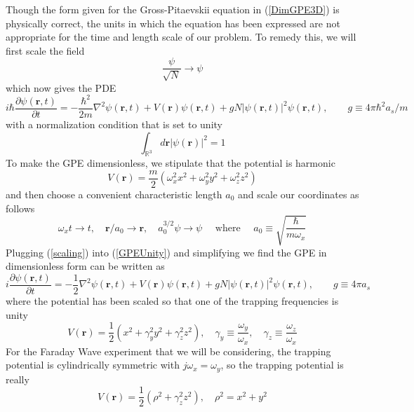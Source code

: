 \documentclass[12]{article}
\begin{document}
Though the form given for the Gross-Pitaevskii equation in (\ref{DimGPE3D}) is physically correct, the units in which the equation has been expressed are not appropriate for the time and length scale of our problem. To remedy this, we will first scale the field
\begin{equation}
\frac{\psi}{\sqrt{N}} \rightarrow \psi
\end{equation}
which now gives the PDE
\begin{equation}
i \hbar \frac{\partial \psi(\mathbf{r}, t)}{\partial t}=-\frac{\hbar^{2}}{2 m} \nabla^{2} \psi(\mathbf{r}, t)+V(\mathbf{r}) \psi(\mathbf{r}, t)+ gN|\psi(\mathbf{r}, t)|^{2} \psi(\mathbf{r}, t), \quad \quad g \equiv 4 \pi \hbar^{2} a_{s} / m
\label{GPEUnity}
\end{equation}
with a normalization condition that is set to unity
\begin{equation}
\int_{\mathbb{R}^{3}} d \mathbf{r}|\psi(\mathbf{r})|^{2} = 1
\end{equation}
To make the GPE dimensionless, we stipulate that the potential is harmonic
\begin{equation}
V(\textbf{r}) = \frac{m}{2}\left(\omega_{x}^{2} x^{2}+\omega_{y}^{2} y^{2}+\omega_{z}^{2} z^{2}\right)
\end{equation}
and then choose a convenient characteristic length $a_0$ and scale our coordinates as follows
\begin{equation}
\omega_{x} t \rightarrow t, \quad \mathbf{r} / a_{0} \rightarrow \mathbf{r}, \quad a_{0}^{3 / 2} \psi \rightarrow \psi \quad \text { where } \quad a_{0} \equiv \sqrt{\frac{\hbar }{ m \omega_{x}}}
\label{scaling}
\end{equation}
Plugging (\ref{scaling}) into (\ref{GPEUnity}) and simplifying we find the GPE in dimensionless form can be written as
\begin{equation}
i \frac{\partial \psi(\mathbf{r}, t)}{\partial t}= -\frac{1}{2 } \nabla^{2} \psi(\mathbf{r}, t)+V(\mathbf{r}) \psi(\mathbf{r}, t)+ gN|\psi(\mathbf{r}, t)|^{2} \psi(\mathbf{r}, t), \quad \quad g \equiv 4 \pi a_{s}
\label{GPE3D}
\end{equation}
where the potential has been scaled so that one of the trapping frequencies is unity
\begin{equation*}
V(\textbf{r}) = \frac{1}{2}\left( x^{2}+\gamma_{y}^{2} y^{2}+\gamma_{z}^{2} z^{2}\right), \quad \gamma_y \equiv \frac{\omega_y}{\omega_x}, \quad \gamma_z \equiv \frac{\omega_z}{\omega_x}
\end{equation*}
For the Faraday Wave experiment that we will be considering, the trapping potential is cylindrically symmetric with $j\omega_x = \omega_y$, so the trapping potential is really
\begin{equation}
V(\textbf{r}) = \frac{1}{2}\left( \rho^{2}+\gamma_{z}^{2} z^{2}\right), \quad \rho^2 = x^2 + y^2
\end{equation}
\end{document}
